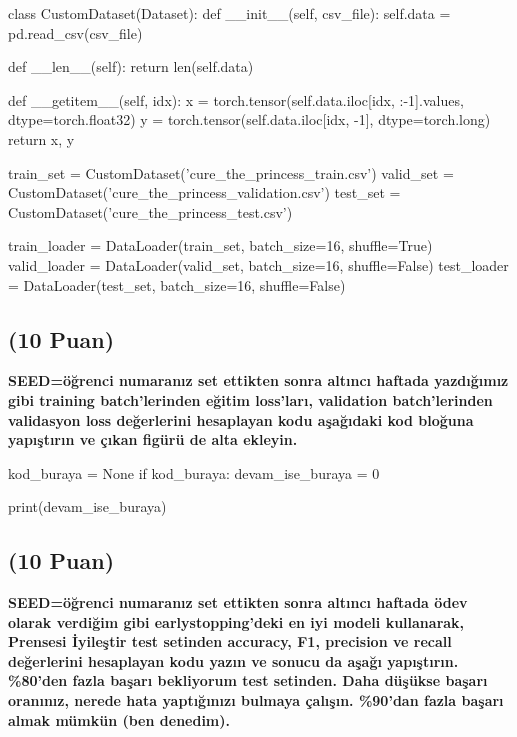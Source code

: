 \documentclass[11pt]{article}
\begin{document}
\begin{python}
class CustomDataset(Dataset):
    def __init__(self, csv_file):
        self.data = pd.read_csv(csv_file)

    def __len__(self):
        return len(self.data)

    def __getitem__(self, idx):
        x = torch.tensor(self.data.iloc[idx, :-1].values, dtype=torch.float32)
        y = torch.tensor(self.data.iloc[idx, -1], dtype=torch.long)
        return x, y

train_set = CustomDataset('cure_the_princess_train.csv')
valid_set = CustomDataset('cure_the_princess_validation.csv')
test_set = CustomDataset('cure_the_princess_test.csv')

train_loader = DataLoader(train_set, batch_size=16, shuffle=True)
valid_loader = DataLoader(valid_set, batch_size=16, shuffle=False)
test_loader = DataLoader(test_set, batch_size=16, shuffle=False)
\end{python}

\subsection{(10 Puan)} \textbf{SEED=öğrenci numaranız set ettikten sonra altıncı haftada yazdığımız gibi training batch'lerinden eğitim loss'ları, validation batch'lerinden validasyon loss değerlerini hesaplayan kodu aşağıdaki kod bloğuna yapıştırın ve çıkan figürü de alta ekleyin.}

\begin{python}
kod_buraya = None
if kod_buraya:
    devam_ise_buraya = 0

print(devam_ise_buraya)
\end{python}

\begin{comment}
\begin{figure}[ht!]
    \centering
    \texttt{[image: mypicturehere.png]}
    \caption{Buraya açıklama yazın}
    \label{fig:my_pic}
\end{figure}
\end{comment}

\subsection{(10 Puan)} \textbf{SEED=öğrenci numaranız set ettikten sonra altıncı haftada ödev olarak verdiğim gibi earlystopping'deki en iyi modeli kullanarak, Prensesi İyileştir test setinden accuracy, F1, precision ve recall değerlerini hesaplayan kodu yazın ve sonucu da aşağı yapıştırın. \%80'den fazla başarı bekliyorum test setinden. Daha düşükse başarı oranınız, nerede hata yaptığınızı bulmaya çalışın. \%90'dan fazla başarı almak mümkün (ben denedim).}
\end{document}

